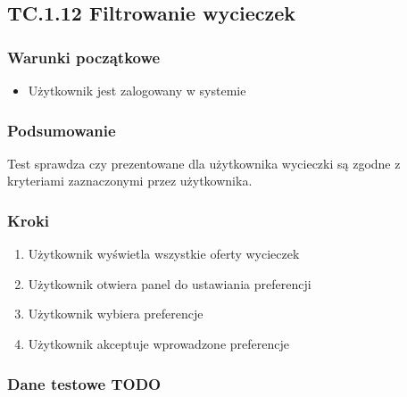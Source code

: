 \documentclass[a4paper,15pt]{article}
\begin{document}
\newpage
\begin{framed}
\subsection{TC.1.12 Filtrowanie wycieczek}


\vspace{0.5cm}

\subsubsection{Warunki początkowe}
\begin{itemize}
\item Użytkownik jest zalogowany w systemie
\end{itemize}

\subsubsection{Podsumowanie}
Test sprawdza czy prezentowane dla użytkownika wycieczki są zgodne z kryteriami zaznaczonymi przez użytkownika. 

\subsubsection{Kroki}
\begin{enumerate}
\item Użytkownik wyświetla wszystkie oferty wycieczek
\item Użytkownik otwiera panel do ustawiania preferencji
\item Użytkownik wybiera preferencje
\item Użytkownik akceptuje wprowadzone preferencje
\end{enumerate}

\subsubsection{Dane testowe TODO}


\end{framed}
\end{document}
